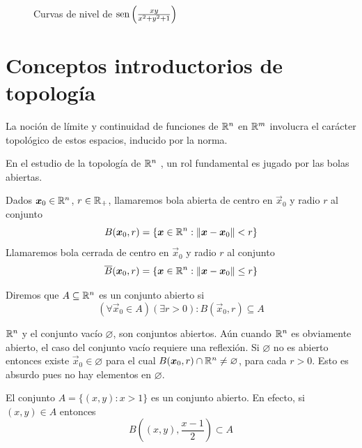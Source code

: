 \begin{ejemplo}
\begin{figure}[H]
\begin{minipage}[t]{.45\textwidth}
\caption{Curvas de nivel de $\text{sen}\left(\frac{xy}{x^2+y^2+1}\right)$}
\label{fig:GraficoSeno2}
\end{minipage}
\end{figure}
\end{ejemplo}

\section{Conceptos introductorios de topolog\'ia}

La noci\'on de l\'imite y continuidad de funciones de $\mathbb{R}^n$ en $\mathbb{R}^m$ involucra el car\'acter topol\'ogico de estos espacios, inducido por la norma.

En el estudio de la topolog\'ia de $\mathbb{R}^n$ , un rol fundamental es jugado por las
bolas abiertas.
\begin{definicion} Dados $\boldsymbol{x}_0\in \mathbb{R}^n$, $r\in \mathbb{R}_+$, llamaremos bola abierta  de centro en $\vec{x}_0$ y radio $r$ al conjunto
$$B(\boldsymbol{x}_0, r)=\{\boldsymbol{x}\in \mathbb{R}^n : \|\boldsymbol{x}-\boldsymbol{x}_0\|<r\}$$
Llamaremos bola cerrada de centro en $\vec{x}_0$ y radio $r$ al conjunto
$$\overline{B}(\boldsymbol{x}_0, r)=\{\boldsymbol{x}\in \mathbb{R}^n : \|\boldsymbol{x}-\boldsymbol{x}_0\|\le r\}$$
\end{definicion}

\begin{definicion} Diremos que $A\subseteq \mathbb{R}^n$ es un conjunto abierto si
$$(\forall \vec{x}_0\in A)( \exists r>0) : B(\vec{x}_0,r)\subseteq A$$
\end{definicion}

\begin{ejemplo}  
$\mathbb{R}^n$ y el conjunto vac\'io $\varnothing$, son 
conjuntos abiertos. A\'un cuando $\mathbb{R}^n$ es obviamente abierto, 
el caso del conjunto vac\'io requiere una reflexi\'on. Si $\varnothing$ no 
es abierto entonces existe $\vec{x}_0\in \varnothing$ para el cual  
$B(\boldsymbol{x}_0,r)\cap \mathbb{R}^n \not = \varnothing$, para cada $r>0$. 
Esto es absurdo pues no hay elementos en $\varnothing$.
\end{ejemplo} 

\begin{ejemplo}
El conjunto $A=\{(x,y) : x>1\}$ es un conjunto abierto. En efecto, si
$(x,y)\in A$ entonces $$B\left((x,y), \frac{x-1}{2}\right)\subset A$$
\end{ejemplo} 

